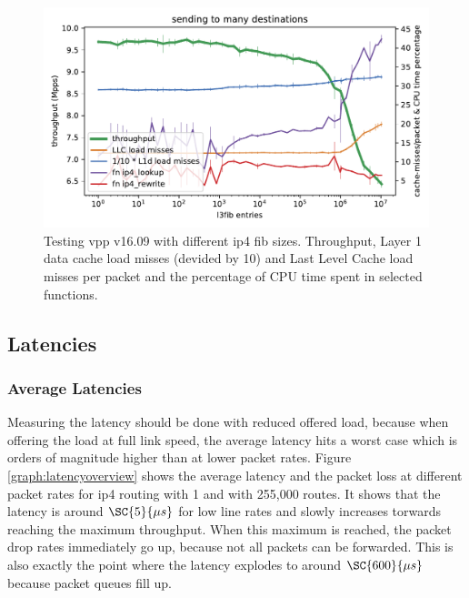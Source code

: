 \begin{figure}[!ht]
\noindent\hspace{0.5mm}\includegraphics[width=\linewidth]{pics/throughput_l3_routes_klaipeda_v1609_32ghz_v2.pdf}
\caption{Testing \Ac{vpp} v16.09 with different \Ac{ip4} \Ac{fib} sizes. Throughput, Layer 1 data cache load misses (devided by 10) and Last Level Cache load misses per packet and the percentage of CPU time spent in selected functions. }
\label{graph:ip4fiblegacy}
\end{figure}




\subsection{Latencies}

\subsubsection{Average Latencies}


Measuring the latency should be done with reduced offered load,
because when offering the load at full link speed, the average latency
hits a worst case which is orders of magnitude higher than at lower
packet rates. Figure \ref{graph:latencyoverview} shows the average
latency and the packet loss at different packet rates for \Ac{ip4}
routing with 1 and with 255,000 routes. It shows that the latency is
around $\SC{5}{\mu s}$ for low line rates and slowly increases
torwards reaching the maximum throughput. When this maximum is
reached, the packet drop rates immediately go up, because not all
packets can be forwarded. This is also exactly the point where the
latency explodes to around $\SC{600}{\mu s}$ because packet queues
fill up.

